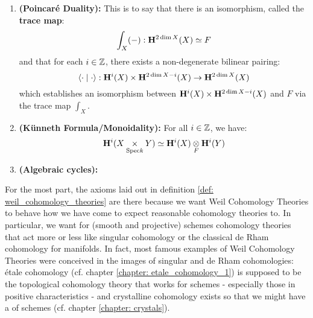 \begin{definition}
\begin{enumerate}
                            \item \textbf{(Poincar\'e Duality):} This is to say that there is an isomorphism, called the \textbf{trace map}:
                                $$\int_X(-): \mathbf{H}^{2 \dim X}(X) \simeq F$$
                            and that for each $i \in \mathbb{Z}$, there exists a non-degenerate bilinear pairing:
                                $$\<\cdot \mid \cdot\>: \H^i(X) \x \H^{2\dim X - i}(X) \to \H^{2 \dim X}(X)$$
                            which establishes an isomorphism between $\H^i(X) \x \H^{2\dim X - i}(X)$ and $F$ via the trace map $\int_X$. 
                            \item \textbf{(K\"unneth Formula/Monoidality):} For all $i \in \mathbb{Z}$, we have:
                                $$\H^i(X \x_{\Spec k} Y) \cong \H^i(X) \tensor_F \H^i(Y)$$
                            \item \textbf{(Algebraic cycles):}
                        \end{enumerate}
                \end{definition}
                \begin{remark} \label{remark: motivation_for_motives}
                    For the most part, the axioms laid out in definition \ref{def: weil_cohomology_theories} are there because we want Weil Cohomology Theories to behave how we have come to expect reasonable  cohomology theories to. In particular, we want for (smooth and projective) schemes cohomology theories that act more or less like singular cohomology or the classical de Rham cohomology for manifolds. In fact, most famous examples of Weil Cohomology Theories were conceived in the images of singular and de Rham cohomologies: \'etale cohomology (cf. chapter \ref{chapter: etale_cohomology_1}) is supposed to be the topological cohomology theory that works for schemes - especially those in positive characteristics - and crystalline cohomology exists so that we might have a  of schemes (cf. chapter \ref{chapter: crystals}). 
                \end{remark}
                \begin{remark} \label{remark: lefschetz_axioms}
                    
                \end{remark}

